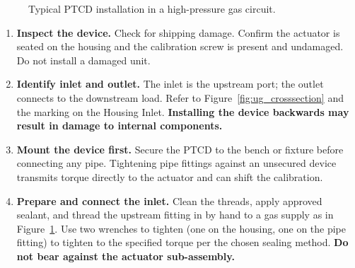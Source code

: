 \documentclass[12pt, letterpaper]{report}%
\newcounter{mycounter}           %
\newcounter{sub}[mycounter]      %
\begin{document}
\begin{appendices}
\begin{figure}[htbp]
		\caption{Typical PTCD installation in a high-pressure gas circuit.}
		\label{fig:ug_install}
	\end{figure}

	\begin{enumerate}[leftmargin=1.8em, itemsep=6pt]

		\item \textbf{Inspect the device.} Check for shipping damage. Confirm the actuator is seated on the housing and the calibration screw is present and undamaged. Do not install a damaged unit.

		\item \textbf{Identify inlet and outlet.} The inlet is the upstream port; the outlet connects to the downstream load. Refer to Figure~\ref{fig:ug_crosssection} and the marking on the Housing Inlet. \textbf{Installing the device backwards may result in damage to internal components.}

		\item \textbf{Mount the device first.} Secure the PTCD to the bench or fixture before connecting any pipe. Tightening pipe fittings against an unsecured device transmits torque directly to the actuator and can shift the calibration.

		\item \textbf{Prepare and connect the inlet.} Clean the threads, apply approved sealant, and thread the upstream fitting in by hand to a gas supply as in Figure~\ref{fig:ug_install}. Use two wrenches to tighten (one on the housing, one on the pipe fitting) to tighten to the specified torque per the chosen sealing method. \textbf{Do not bear against the actuator sub-assembly.}


\end{enumerate}
\end{appendices}
\end{document}
